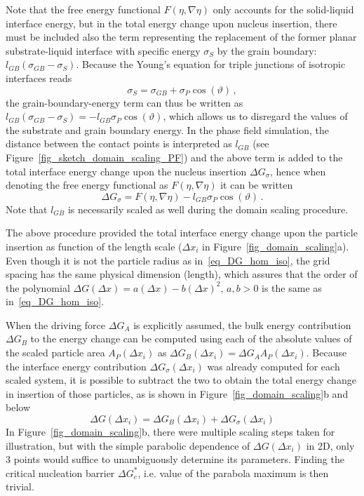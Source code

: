 Note that the free energy functional $F(\eta,\nabla\eta)$ only accounts for the solid-liquid interface energy, but in the total energy change upon nucleus insertion, there must be included also the term representing the replacement of the former planar substrate-liquid interface with specific energy $\sigma_S$ by the grain boundary: $l_{GB}(\sigma_{GB}-\sigma_S)$. Because the Young's equation for triple junctions of isotropic interfaces reads
\begin{equation}\label{eq_young_iso}
	\sigma_S = \sigma_{GB}+\sigma_P\cos(\vartheta) \,,
\end{equation}
the grain-boundary-energy term can thus be written as $l_{GB}(\sigma_{GB}-\sigma_S)=-l_{GB}\sigma_P\cos(\vartheta)$, which allows us to disregard the values of the substrate and grain boundary energy. In the phase field simulation, the distance between the contact points is interpreted as $l_{GB}$ (see Figure~\ref{fig_sketch_domain_scaling_PF}) and the above term is added to the total interface energy change upon the nucleus insertion $\Delta G_\sigma$, hence when denoting the free energy functional as $F(\eta,\nabla\eta)$ it can be written
\begin{equation}
	\Delta G_\sigma = F(\eta,\nabla\eta) - l_{GB}\sigma_P\cos(\vartheta) \,.
\end{equation}
Note that $l_{GB}$ is necessarily scaled as well during the domain scaling procedure.

The above procedure provided the total interface energy change upon the particle insertion as function of the length scale ($\Delta x_i$ in Figure~\ref{fig_domain_scaling}a). Even though it is not the particle radius as in~\eqref{eq_DG_hom_iso}, the grid spacing has the same physical dimension (length), which assures that the order of the polynomial $\Delta G(\Delta x) = a(\Delta x) - b(\Delta x)^2$, $a, b >0$ is the same as in~\eqref{eq_DG_hom_iso}.

When the driving force $\Delta G_A$ is explicitly assumed, the bulk energy contribution $\Delta G_B$ to the energy change can be computed using each of the absolute values of the scaled particle area $A_P(\Delta x_i)$ as $\Delta G_B(\Delta x_i)=\Delta G_A A_P(\Delta x_i)$. Because the interface energy contribution $\Delta G_\sigma(\Delta x_i)$ was already computed for each scaled system, it is possible to subtract the two to obtain the total energy change in insertion of those particles, as is shown in Figure~\ref{fig_domain_scaling}b and below
\begin{equation}
	\Delta G(\Delta x_i) = \Delta G_B(\Delta x_i) + \Delta G_\sigma(\Delta x_i)
\end{equation}
 In Figure~\ref{fig_domain_scaling}b, there were multiple scaling steps taken for illustration, but with the simple parabolic dependence of $\Delta G(\Delta x_i)$ in 2D, only 3 points would suffice to unambiguously determine its parameters. Finding the critical nucleation barrier $\Delta G^*_c$, i.e. value of the parabola maximum is then trivial. 

